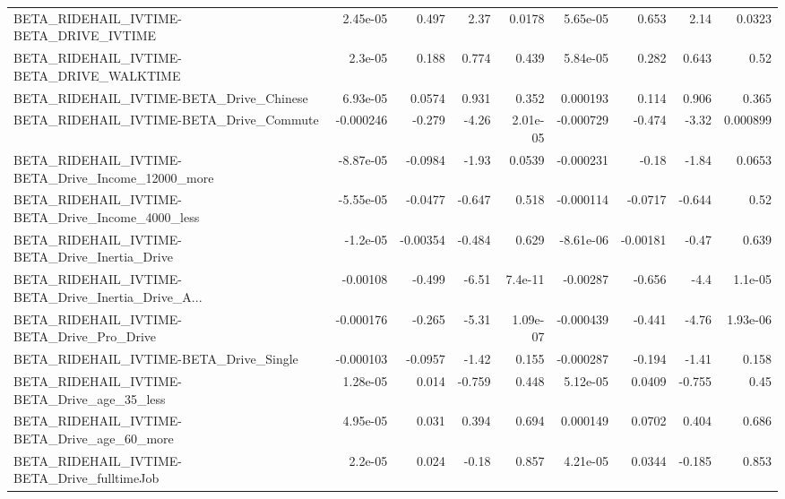 \begin{tabular}{lrrrrrrrr}
BETA\_RIDEHAIL\_IVTIME-BETA\_DRIVE\_IVTIME             &    2.45e-05 &        0.497 &     2.37 &   0.0178 &   5.65e-05 &       0.653 &         2.14 &        0.0323 \\
BETA\_RIDEHAIL\_IVTIME-BETA\_DRIVE\_WALKTIME           &     2.3e-05 &        0.188 &    0.774 &    0.439 &   5.84e-05 &       0.282 &        0.643 &          0.52 \\
BETA\_RIDEHAIL\_IVTIME-BETA\_Drive\_Chinese            &    6.93e-05 &       0.0574 &    0.931 &    0.352 &   0.000193 &       0.114 &        0.906 &         0.365 \\
BETA\_RIDEHAIL\_IVTIME-BETA\_Drive\_Commute            &   -0.000246 &       -0.279 &    -4.26 & 2.01e-05 &  -0.000729 &      -0.474 &        -3.32 &      0.000899 \\
BETA\_RIDEHAIL\_IVTIME-BETA\_Drive\_Income\_12000\_more  &   -8.87e-05 &      -0.0984 &    -1.93 &   0.0539 &  -0.000231 &       -0.18 &        -1.84 &        0.0653 \\
BETA\_RIDEHAIL\_IVTIME-BETA\_Drive\_Income\_4000\_less   &   -5.55e-05 &      -0.0477 &   -0.647 &    0.518 &  -0.000114 &     -0.0717 &       -0.644 &          0.52 \\
BETA\_RIDEHAIL\_IVTIME-BETA\_Drive\_Inertia\_Drive      &    -1.2e-05 &     -0.00354 &   -0.484 &    0.629 &  -8.61e-06 &    -0.00181 &        -0.47 &         0.639 \\
BETA\_RIDEHAIL\_IVTIME-BETA\_Drive\_Inertia\_Drive\_A... &    -0.00108 &       -0.499 &    -6.51 &  7.4e-11 &   -0.00287 &      -0.656 &         -4.4 &       1.1e-05 \\
BETA\_RIDEHAIL\_IVTIME-BETA\_Drive\_Pro\_Drive          &   -0.000176 &       -0.265 &    -5.31 & 1.09e-07 &  -0.000439 &      -0.441 &        -4.76 &      1.93e-06 \\
BETA\_RIDEHAIL\_IVTIME-BETA\_Drive\_Single             &   -0.000103 &      -0.0957 &    -1.42 &    0.155 &  -0.000287 &      -0.194 &        -1.41 &         0.158 \\
BETA\_RIDEHAIL\_IVTIME-BETA\_Drive\_age\_35\_less        &    1.28e-05 &        0.014 &   -0.759 &    0.448 &   5.12e-05 &      0.0409 &       -0.755 &          0.45 \\
BETA\_RIDEHAIL\_IVTIME-BETA\_Drive\_age\_60\_more        &    4.95e-05 &        0.031 &    0.394 &    0.694 &   0.000149 &      0.0702 &        0.404 &         0.686 \\
BETA\_RIDEHAIL\_IVTIME-BETA\_Drive\_fulltimeJob        &     2.2e-05 &        0.024 &    -0.18 &    0.857 &   4.21e-05 &      0.0344 &       -0.185 &         0.853 \\

\end{tabular}

